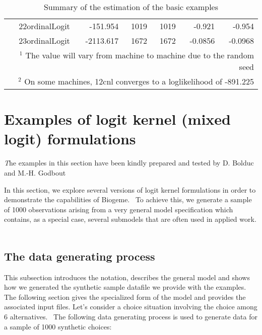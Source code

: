 \documentclass[12pt]{memoir}
\begin{document}
\begin{table}[htbf]
\begin{center}
\begin{tabular}{rrrrrr}
22ordinalLogit &   -151.954 &       1019 &       1019 &     -0.921 &     -0.954 \\

23ordinalLogit &  -2113.617 &       1672 &       1672 &     -0.0856 &    -0.0968 \\

\hline
\multicolumn{6}{r}{\footnotesize $\mbox{}^1$ The value will vary from machine to machine due to the random seed }\\
\multicolumn{6}{r}{\footnotesize $\mbox{}^2$ On some machines, 12cnl converges to a loglikelihood of -891.225 }
\end{tabular}  
\end{center}





\caption{\label{tab:summary}Summary of the estimation of the basic examples}
\end{table}


\section{Examples of logit kernel (mixed logit) formulations}

{\emph The examples in this section have been kindly prepared and tested by D. Bolduc and M.-H. Godbout}

In this section, we explore several versions of logit kernel formulations in
order to demonstrate the capabilities of Biogeme. \ To achieve this, we
generate a sample of 1000 observations arising from a very general model
specification which contains, as a special case, several submodels that are
often used in applied work. \ 

\subsection{The data generating process}

This subsection introduces the notation, describes the general model and shows
how we generated the synthetic sample datafile we provide with the examples.
The following section gives the specialized form of the model and 
provides the associated input files. Let's consider a choice situation involving
the choice among 6 alternatives. \ The following data generating process is
used to generate data for a sample of 1000 synthetic choices:\ %
\end{document}
